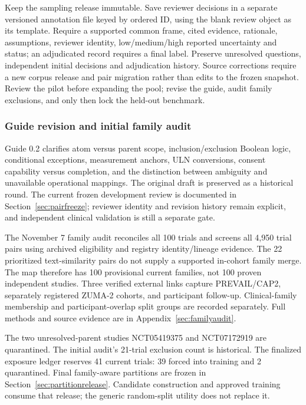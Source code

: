 \documentclass[10pt,letterpaper]{article}
\begin{document}
Keep the sampling release immutable. Save reviewer decisions in a separate
versioned annotation file keyed by ordered ID, using the blank review object
as its template. Require a supported common frame, cited evidence, rationale,
assumptions, reviewer identity, low/medium/high reported uncertainty and status;
an adjudicated record requires a final label. Preserve unresolved questions,
independent initial decisions and adjudication history. Source corrections
require a new corpus release and pair migration rather than edits to the
frozen snapshot. Review the pilot before expanding the pool; revise the guide,
audit family exclusions, and only then lock the held-out benchmark.

\subsubsection{Guide revision and initial family audit}
Guide 0.2 clarifies atom versus parent scope, inclusion/exclusion Boolean
logic, conditional exceptions, measurement anchors, ULN conversions,
consent capability versus completion, and the distinction between ambiguity
and unavailable operational mappings. The original draft is preserved as a
historical round. The current frozen development review is documented in
Section~\ref{sec:pairfreeze}; reviewer identity and revision history remain
explicit, and independent clinical validation is still a separate gate.

The November 7 family audit reconciles all 100 trials and screens all 4,950
trial pairs using archived eligibility and registry identity/lineage evidence.
The 22 prioritized text-similarity pairs do not supply a supported in-cohort
family merge. The map therefore has 100 provisional current families, not
100 proven independent studies. Three verified external links capture
PREVAIL/CAP2, separately registered ZUMA-2 cohorts, and participant follow-up.
Clinical-family membership and participant-overlap split groups are recorded
separately. Full methods and source evidence are in
Appendix~\ref{sec:familyaudit}.

The two unresolved-parent studies NCT05419375 and NCT07172919 are
quarantined. The initial audit's 21-trial exclusion count is historical.
The finalized exposure ledger reserves 41 current trials: 39 forced into
training and 2 quarantined. Final family-aware partitions are frozen in
Section~\ref{sec:partitionrelease}. Candidate construction and approved
training consume that release; the generic random-split utility does not
replace it.
\end{document}
